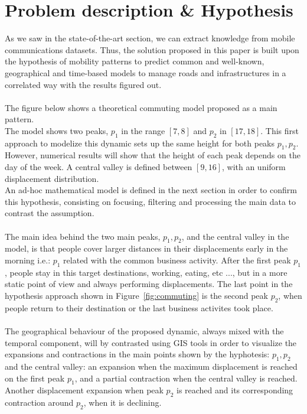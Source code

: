 \newpage

\section{Problem description \& Hypothesis}
As we saw in the state-of-the-art section, we can extract knowledge from mobile communications datasets. Thus, the solution proposed in this paper is built upon the hypothesis of mobility patterns to predict common and well-known, geographical and time-based models to manage roads and infrastructures in a correlated way with the results figured out.
\\
\\
The figure below shows a theoretical commuting model proposed as a main pattern. 
\\
The model shows two peaks, $p_1$ in the range $[7, 8]$ and $p_2$ in $[17, 18]$. This first approach to modelize this dynamic sets up the same height for both peaks $p_1, p_2$. However, numerical results will show that the height of each peak depends on the day of the week. A central valley is defined between $[9, 16]$, with an uniform displacement distribution.
\\
An ad-hoc mathematical model is defined in the next section in order to confirm this hypothesis, consisting on focusing, filtering and processing the main data to contrast the assumption.
\\
\\
The main idea behind the two main peaks, $p_1, p_2$, and the central valley in the model, is that people cover larger distances in their displacements early in the morning i.e.: $p_1$ related with the common business activity. After the first peak $p_1$, people stay in this target destinations, working, eating, etc ..., but in a more static point of view and always performing displacements. The last point in the hypothesis approach shown in Figure~\ref{fig:commuting} is the second peak $p_2$, when people return to their destination or the last business activites took place.
\\
\\
The geographical behaviour of the proposed dynamic, always mixed with the temporal component, will by contrasted using GIS tools in order to visualize the expansions and contractions in the main points shown by the hyphotesis: $p_1, p_2$ and the central valley: an expansion when the maximum displacement is reached on the first peak $p_1$, and a partial contraction when the central valley is reached. Another displacement expansion when peak $p_2$ is reached and its corresponding contraction around $p_2$, when it is declining.


